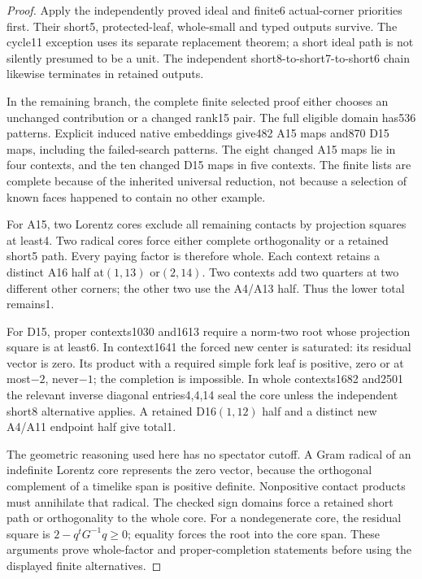 \documentclass[11pt]{article}
\theoremstyle{remark}\newtheorem{remark}[theorem]{Remark}
\begin{document}
\begin{proof}
Apply the independently proved ideal and finite6 actual-corner priorities
first. Their short5, protected-leaf, whole-small and typed outputs survive.
The cycle11 exception uses its separate replacement theorem; a short
ideal path is not silently presumed to be a unit. The independent
short8-to-short7-to-short6 chain likewise terminates in retained outputs.

In the remaining branch, the complete finite selected proof either
chooses an unchanged contribution or a changed rank15 pair. The full
eligible domain has536 patterns. Explicit induced native embeddings
give482 A15 maps and870 D15 maps, including the failed-search patterns.
The eight changed A15 maps lie in four contexts, and the ten changed
D15 maps in five contexts. The finite lists are complete because of
the inherited universal reduction, not because a selection of known
faces happened to contain no other example.

For A15, two Lorentz cores exclude all remaining contacts by projection
squares at least4. Two radical cores force either complete orthogonality
or a retained short5 path. Every paying factor is therefore whole.
Each context retains a distinct A16 half at$(1,13)$ or$(2,14)$.
Two contexts add two quarters at two different other corners; the other
two use the A4/A13 half. Thus the lower total remains1.

For D15, proper contexts1030 and1613 require a norm-two root whose
projection square is at least6. In context1641 the forced new center is
saturated: its residual vector is zero. Its product with a required
simple fork leaf is positive, zero or at most$-2$, never$-1$; the
completion is impossible. In whole contexts1682 and2501 the relevant
inverse diagonal entries4,4,14 seal the core unless the independent
short8 alternative applies. A retained D16$(1,12)$ half and a distinct
new A4/A11 endpoint half give total1.

The geometric reasoning used here has no spectator cutoff. A Gram
radical of an indefinite Lorentz core represents the zero vector,
because the orthogonal complement of a timelike span is positive
definite. Nonpositive contact products must annihilate that radical.
The checked sign domains force a retained short path or orthogonality
to the whole core. For a nondegenerate core, the residual square is
$2-q^tG^{-1}q\geq0$; equality forces the root into the core span.
These arguments prove whole-factor and proper-completion statements
before using the displayed finite alternatives.


\end{proof}
\end{document}
